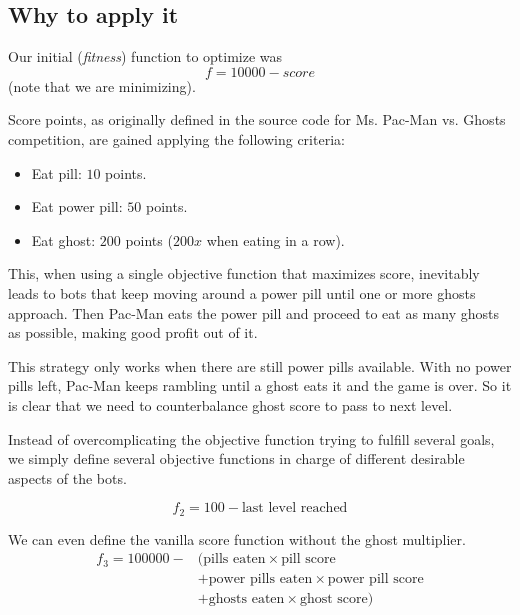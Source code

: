 \documentclass{llncs}
\newcommand{\pacman}{Ms. Pac-Man vs. Ghosts }
\newcommand{\paco}{Pac-Man }
\begin{document}

\subsection{Why to apply it}
Our initial (\textit{fitness}) function to optimize was
\begin{equation} %
f = 10000 - score
\end{equation}
(note that we are minimizing).

Score points, as originally defined in the source code for \pacman competition, are gained applying the following criteria:
\begin{itemize}
\item Eat pill: $10$ points.
\item Eat power pill: $50$ points.
\item Eat ghost: $200$ points ($200x$ when eating in a row).
\end{itemize}

This, when using a single objective function that maximizes score, inevitably leads to bots that keep moving around a power pill until one or more ghosts approach. Then \paco eats the power pill and proceed to eat as many ghosts as possible, making good profit out of it.

This strategy only works when there are still power pills available. With no power pills left, \paco keeps rambling until a ghost eats it and the game is over. So it is clear that we need to counterbalance ghost score to pass to next level.

Instead of overcomplicating the objective function trying to fulfill several goals, we simply define several objective functions in charge of different desirable aspects of the bots.

\begin{equation}
f_2 = 100 - \text{last level reached}
\end{equation}

We can even define the vanilla score function without the ghost multiplier.
\begin{equation}
\begin{split}
f_3 = 100000 - & (\text{pills eaten} \times \text{pill score} \\
& + \text{power pills eaten} \times \text{power pill score} \\
& + \text{ghosts eaten} \times \text{ghost score}) \\
\end{split}
\end{equation}
\end{document}
